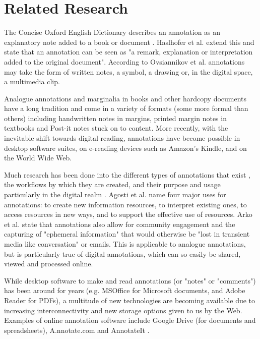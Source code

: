 
\chapter{Related Research} %

\label{Chapter3} %


The Concise Oxford English Dictionary describes an annotation as an explanatory note added to a book or document \citep{OxfordDict}. Haslhofer et al. \citep[p. 17]{LEMO} extend this and state that an annotation can be seen as "a remark, explanation or interpretation added to the original document". According to Ovsiannikov et al. \citep{Ovsiannikov} annotations may take the form of written notes, a symbol, a drawing or, in the digital space, a multimedia clip. 

Analogue annotations and marginalia in books and other hardcopy documents have a long tradition \citep{LEMO} and come in a variety of formats (some more formal than others) including handwritten notes in margins, printed margin notes in textbooks and Post-it notes stuck on to content. More recently, with the inevitable shift towards digital reading, annotations have become possible in desktop software suites, on e-reading devices such as Amazon's Kindle, and on the World Wide Web. 

Much research has been done into the different types of annotations that exist \citep{Marshall2000} \citep{Marshall2004}, the workflows by which they are created, and their purpose and usage  particularly in the digital realm \citep{Agosti} \citep{Ovsiannikov}. Agosti et al. \citep{Agosti} name four major uses for annotations: to create new information resources, to interpret existing ones, to access resources in new ways, and to support the effective use of resources.  Arko et al. \citep{Arko} state that annotations also allow for community engagement and the capturing of "ephemeral information" that would otherwise be "lost in transient media like conversation" or emails. This is applicable to analogue annotations, but is particularly true of digital annotations, which can so easily be shared, viewed and processed online.


While desktop software to make and read annotations (or "notes" or "comments") has been around for years (e.g. MSOffice \citep{MSOffice} for Microsoft documents, and Adobe Reader \citep{Adobe} for PDFs), a multitude of new technologies are becoming available due to increasing interconnectivity and new storage options given to us by the Web. Examples of online annotation software include Google Drive \citep{GDrive} (for documents and spreadsheets), A.nnotate.com \citep{AnnotateCom} and AnnotateIt \citep{AnnotateIt}.

